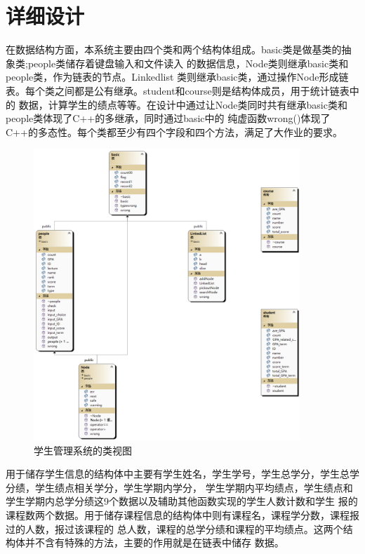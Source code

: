 \documentclass[fontset=windows]{article}
\begin{document}
\section{详细设计}
在数据结构方面，本系统主要由四个类和两个结构体组成。basic类是做基类的抽象类;people类储存着键盘输入和文件读入
的数据信息，Node类则继承basic类和people类，作为链表的节点。Linkedlist
类则继承basic类，通过操作Node形成链表。每个类之间都是公有继承。student和course则是结构体成员，用于统计链表中的
数据，计算学生的绩点等等。在设计中通过让Node类同时共有继承basic类和people类体现了C++的多继承，同时通过basic中的
纯虚函数wrong()体现了C++的多态性。每个类都至少有四个字段和四个方法，满足了大作业的要求。
\vspace{0.5cm}
\begin{figure}[h]
	\begin{center}
		\includegraphics[height = 11cm]{ClassDiagram.png}
		\vspace{1cm}
		\caption{学生管理系统的类视图}
	\end{center}
\end{figure}

用于储存学生信息的结构体中主要有学生姓名，学生学号，学生总学分，学生总学分绩，学生绩点相关学分，学生学期内学分，
学生学期内平均绩点，学生绩点和学生学期内总学分绩这9个数据以及辅助其他函数实现的学生人数计数和学生
报的课程数两个数据。用于储存课程信息的结构体中则有课程名，课程学分数，课程报过的人数，报过该课程的
总人数，课程的总学分绩和课程的平均绩点。这两个结构体并不含有特殊的方法，主要的作用就是在链表中储存
数据。
\end{document}
